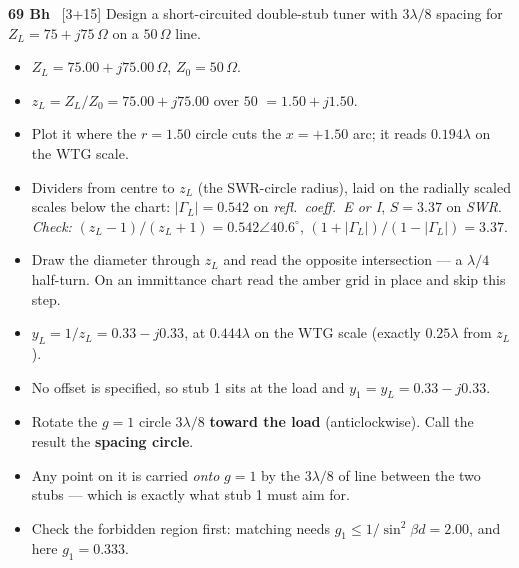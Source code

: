 \begin{asked}{\textbf{69 Bh} \ [3+15]}
Design a short-circuited double-stub tuner with $3\lambda/8$ spacing for $Z_L = 75+j75\,\Omega$ on a $50\,\Omega$ line.
\end{asked}
\begin{itemize}
  \item $Z_L = 75.00 + j75.00\,\Omega$, $Z_0 = 50\,\Omega$.
\end{itemize}
\begin{itemize}
  \item $z_L = Z_L/Z_0 = 75.00 + j75.00$ over $50$ $=1.50 + j1.50$.
  \item Plot it where the $r = 1.50$ circle cuts the $x = +1.50$ arc; it reads $0.194\lambda$ on the WTG scale.
  \item Dividers from centre to $z_L$ (the SWR-circle radius), laid on the radially scaled scales below the chart: $|\Gamma_L| = 0.542$ on \emph{refl.\ coeff.\ E or I}, $S = 3.37$ on \emph{SWR}. \textit{Check:} $(z_L-1)/(z_L+1) = 0.542\angle 40.6^\circ$, $(1+|\Gamma_L|)/(1-|\Gamma_L|) = 3.37$.
\end{itemize}
\begin{itemize}
  \item Draw the diameter through $z_L$ and read the opposite intersection --- a $\lambda/4$ half-turn. On an immittance chart read the amber grid in place and skip this step.
  \item $y_L = 1/z_L = 0.33 - j0.33$, at $0.444\lambda$ on the WTG scale (exactly $0.25\lambda$ from $z_L$).
\end{itemize}
\begin{itemize}
  \item No offset is specified, so stub 1 sits at the load and $y_1 = y_L = 0.33 - j0.33$.
\end{itemize}
\begin{itemize}
  \item Rotate the $g=1$ circle $3\lambda/8$ \textbf{toward the load} (anticlockwise). Call the result the \textbf{spacing circle}.
  \item Any point on it is carried \emph{onto} $g=1$ by the $3\lambda/8$ of line between the two stubs --- which is exactly what stub 1 must aim for.
  \item Check the forbidden region first: matching needs $g_1 \le 1/\sin^2\beta d = 2.00$, and here $g_1 = 0.333$. \checkmark
\end{itemize}
